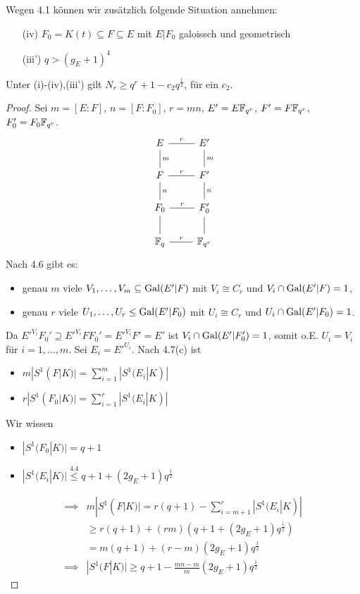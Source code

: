 \begin{bemerkungnr}
    Wegen 4.1 können wir zusätzlich folgende Situation annehmen:
    \begin{itemize}
        \item[(iv)] $F_0 = K(t) \subseteq F \subseteq E$ mit $E|F_0$ galoissch und geometrisch
        \item[(iii')] $q > (g_E +1)^4$ 
    \end{itemize}
\end{bemerkungnr}

\begin{satz}
    Unter (i)-(iv),(iii') gilt $N_r \geq q^r +1 -c_2q^\frac{1}{2}$, für ein $c_2$.
\end{satz}
\begin{proof}
    Sei $m = [E:F]$, $n = [F:F_0]$, $r=mn$, $E'=E\mathbb{F}_{q^r}$, $F'=F\mathbb{F}_{q^r}$, $F_0'=F_0\mathbb{F}_{q^r}$.
    $$\begin{tikzcd}
        E \rar[dash]{r} \dar[dash]{m}& E' \dar[dash]{m}\\
        F \rar[dash]{r} \dar[dash]{n}& F' \dar[dash]{n}\\
        F_0 \rar[dash]{r}\dar[dash]& F_0'\dar[dash]\\
        \F_q \rar[dash]{r}& \F_{q^r}
    \end{tikzcd}$$
    Nach 4.6 gibt es:
    \begin{itemize}
        \item genau $m$ viele $V_1, \ldots, V_m \subseteq \operatorname{Gal}(E'|F)$ mit $V_i \cong C_r$ und $V_i \cap \operatorname{Gal}(E'|F) = 1$,
        \item genau $r$ viele $U_1, \ldots, U_r \leq \operatorname{Gal}(E'|F_0)$ mit $ U_i \cong C_r$ und $U_i \cap \operatorname{Gal}(E'|F_0) = 1$.
    \end{itemize}
    Da $E'^{V_i}F_0' \supseteq E'^{V_i}FF_0' = E'^{V_i}F'=E'$ ist $V_i \cap \operatorname{Gal}(E'|F_0')=1$,
    somit o.E. $U_i = V_i$ für $i=1, \ldots,m$.
    Sei $E_i = E'^{U_i}$. Nach 4.7(c) ist
    \begin{itemize}
        \item $m |S^1(F|K)| = \sum\limits_{i=1}^m |S^1(E_i|K)|$
        \item $r|S^1(F_0|K)| = \sum\limits_{i=1}^r |S^1(E_i|K)|$
    \end{itemize}
    Wir wissen
    \begin{itemize}[label=-]
        \item $|S^1(F_0|K)|=q+1$
        \item $|S^1(E_i|K)| \stackrel{4.4}{\leq} q+1 + (2g_E + 1)q^\frac{1}{2}$
    \end{itemize}
    \begin{align*}
        \implies & m |S^1(F|K)| = r (q+1) - \sum_{i=m+1}^r |S^1(E_i|K)|\\
        & \geq r(q+1) + (rm)(q+1+(2g_E + 1)q^\frac{1}{2})\\
        & = m(q+1) + (r-m)(2g_E+1)q^\frac{1}{2}\\
        \implies & |S^1(F|K)| \geq q +1 - \frac{mn -m}{m}(2g_E + 1)q^\frac{1}{2}
    \end{align*}
\end{proof}
